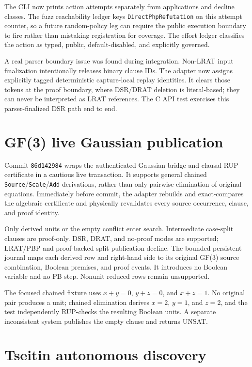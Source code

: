 \documentclass[11pt]{article}
\newcommand{\code}[1]{\texttt{#1}}
\begin{document}
The CLI now prints action attempts separately from applications and decline
classes. The fuzz reachability ledger keys \code{DirectPhpRefutation} on this
attempt counter, so a future random-policy leg can require the public execution
boundary to fire rather than mistaking registration for coverage. The effort
ledger classifies the action as typed, public, default-disabled, and explicitly
governed.

A real parser boundary issue was found during integration. Non-LRAT input
finalization intentionally releases binary clause IDs. The adapter now assigns
explicitly tagged deterministic capture-local replay identities. It clears
those tokens at the proof boundary, where DSR/DRAT deletion is literal-based;
they can never be interpreted as LRAT references. The C API test exercises this
parser-finalized DSR path end to end.

\section*{GF(3) live Gaussian publication}

Commit \code{86d142984} wraps the authenticated Gaussian bridge and clausal RUP
certificate in a cautious live transaction. It supports general chained
\code{Source}/\code{Scale}/\code{Add} derivations, rather than only pairwise
elimination of original equations. Immediately before commit, the adapter
rebuilds and exact-compares the algebraic certificate and physically
revalidates every source occurrence, clause, and proof identity.

Only derived units or the empty conflict enter search. Intermediate case-split
clauses are proof-only. DSR, DRAT, and no-proof modes are supported; LRAT/PBP
and proof-backed split publication decline. The bounded persistent journal maps
each derived row and right-hand side to its original GF(3) source combination,
Boolean premises, and proof events. It introduces no Boolean variable and no PB
step. Nonunit reduced rows remain unsupported.

The focused chained fixture uses $x+y=0$, $y+z=0$, and $x+z=1$. No original
pair produces a unit; chained elimination derives $x=2$, $y=1$, and $z=2$, and
the test independently RUP-checks the resulting Boolean units. A separate
inconsistent system publishes the empty clause and returns UNSAT.

\section*{Tseitin autonomous discovery}
\end{document}
